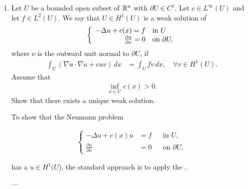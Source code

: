 \documentclass[12pt,a4paper]{report}
\begin{document}
\begin{enumerate}
\newpage
\item Let $U$ be a bounded open subset of $\mathbb{R}^n$ with $\partial U \in C^1$.  Let $c \in L^\infty(U)$ and let $f \in L^2(U)$.  We say that $U\in H^1(U)$ is a weak solution of 
\begin{align*}
	\left \{\begin{array}{rl}
		 -\Delta u+c(x)=f & \text{in } U\\
		\frac{\partial u}{\partial \nu} = 0 & \text{on } \partial U,
	\end{array} \right .
\end{align*}
where $\nu$ is the outward unit normal to $\partial U$, if 
\begin{align*}
	\int_U (\nabla u\cdot\nabla u+cuv)\,dx &= \int_U fv\,dx, \quad \forall v \in H^1(U).
\end{align*}
Assume that 
\begin{align*}
	\inf_{x\in U} c(x) >0.
\end{align*}
Show that there exists a unique weak solution.

\HLINE

To show that the Neumann problem

\begin{align*}
\left\{
\begin{aligned}
-\Delta u + c(x)u &= f &&\text{in } U,\\
\frac{\partial u}{\partial \nu} &=0 &&\text{on } \partial U,
\end{aligned}
\right.
\end{align*}

has a  $u\in H^1(U$), the standard approach is to apply the .

---
\end{enumerate}
\end{document}
